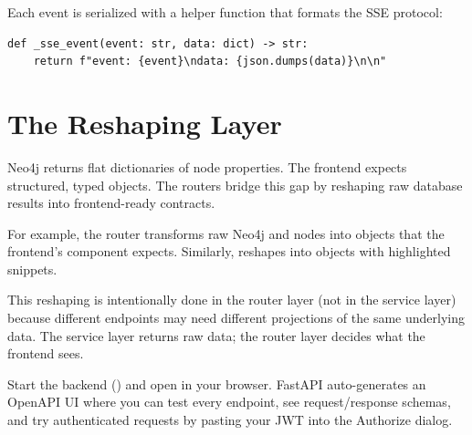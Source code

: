 Each event is serialized with a helper function that formats the SSE
protocol:

\begin{lstlisting}[style=python, caption={SSE event formatter from \codefile{routers/ask.py}.}]
def _sse_event(event: str, data: dict) -> str:
    return f"event: {event}\ndata: {json.dumps(data)}\n\n"
\end{lstlisting}


\section{The Reshaping Layer}
\label{sec:reshaping-layer}

Neo4j returns flat dictionaries of node properties.  The frontend expects
structured, typed objects.  The routers bridge this gap by reshaping raw
database results into frontend-ready contracts.

For example, the  router transforms raw Neo4j
 and  nodes into  objects
that the frontend's  component expects.  Similarly,
 reshapes into  objects with highlighted
snippets.

This reshaping is intentionally done in the router layer (not in the
service layer) because different endpoints may need different projections
of the same underlying data.  The service layer returns raw data; the
router layer decides what the frontend sees.

\begin{tryit}
Start the backend () and open
 in your browser.  FastAPI auto-generates
an OpenAPI UI where you can test every endpoint, see request/response
schemas, and try authenticated requests by pasting your JWT into the
Authorize dialog.
\end{tryit}
